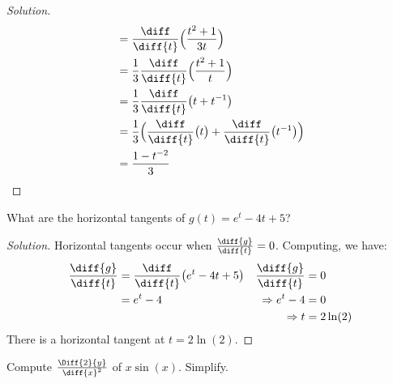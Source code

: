 \documentclass[crop=false,class=book,oneside]{standalone}                      %
\begin{document}
\begin{proof}[Solution]
\begin{minipage}[b]{.49\textwidth}
\begin{align*}
                        &=\frac{\diff}{\diff{t}}
                            \Big(\frac{t^{2}+1}{3t}\Big)\\
                        &=\frac{1}{3}\frac{\diff}{\diff{t}}
                            \Big(\frac{t^{2}+1}{t}\Big)\\
                        &=\frac{1}{3}\frac{\diff}{\diff{t}}
                            \big(t+t^{-1}\big)\\
                        &=\frac{1}{3}\Big(\frac{\diff}{\diff{t}}
                            \big(t\big)
                        +\frac{\diff}{\diff{t}}
                            \big(t^{-1}\big)\Big)\\
                        &=\frac{1-t^{-2}}{3}
                    \end{align*}
                \end{minipage}
            \end{proof}
            \begin{problem}
                What are the horizontal tangents of
                $g(t)=e^{t}-4t+5$?
            \end{problem}
            \begin{proof}[Solution]
                Horizontal tangents occur when
                $\frac{\diff{g}}{\diff{t}}=0$.
                Computing, we have:
                \begin{align*}
                    \frac{\diff{g}}{\diff{t}}
                    &=\frac{\diff}{\diff{t}}
                        \big(e^{t}-4t+5\big)
                    &
                    \frac{\diff{g}}{\diff{t}}
                    &=0
                    \\
                    &=e^{t}-4
                    &
                    \Rightarrow
                    e^{t}-4&=0\\
                    &&
                    \Rightarrow
                    t&=2\ln(2)
                \end{align*}
                There is a horizontal tangent at $t=2\ln(2)$.
            \end{proof}
            \begin{problem}
                Compute $\frac{\Diff{2}{y}}{\diff{x}^{2}}$
                of $x\sin(x)$. Simplify.
            \end{problem}
\end{document}
